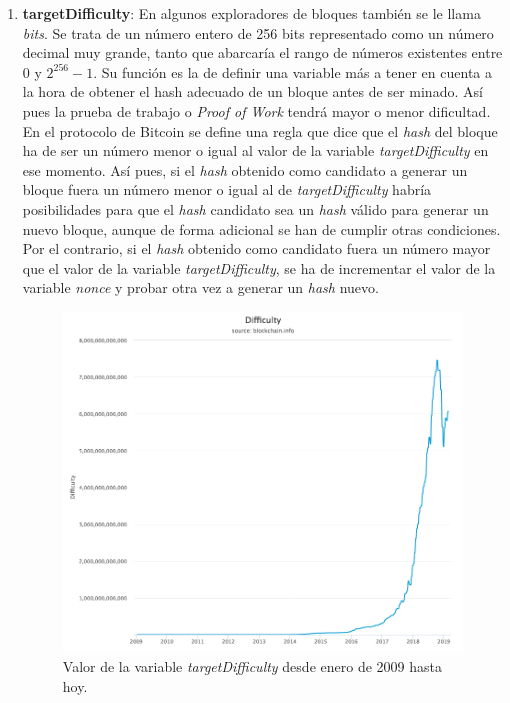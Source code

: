 \documentclass{article}
\begin{document}
\begin{enumerate}
\begin{verbatim}
    printf("Timestamp epoch: %ld\n", (long) tod);
}
        \end{verbatim}
        
    
        \item \textbf{targetDifficulty}: En algunos exploradores de bloques también se le llama \textit{bits}. Se trata de un número entero de 256 bits representado como un número decimal muy grande, tanto que abarcaría el rango de números existentes entre $0$ y $2^{256}-1$. Su función es la de definir una variable más a tener en cuenta a la hora de obtener el hash adecuado de un bloque antes de ser minado. Así pues la prueba de trabajo o \textit{Proof of Work} tendrá mayor o menor dificultad. En el protocolo de Bitcoin se define una regla que dice que el \textit{hash} del bloque ha de ser un número menor o igual al valor de la variable \textit{targetDifficulty} en ese momento. Así pues, si el \textit{hash} obtenido como candidato a generar un bloque fuera un número menor o igual al de \textit{targetDifficulty} habría posibilidades para que el \textit{hash} candidato sea un \textit{hash} válido para generar un nuevo bloque, aunque de forma adicional se han de cumplir otras condiciones. Por el contrario, si el \textit{hash} obtenido como candidato fuera un número mayor que el valor de la variable \textit{targetDifficulty}, se ha de incrementar el valor de la variable \textit{nonce} y probar otra vez a generar un \textit{hash} nuevo.
        
        \begin{figure}[H]
        \centering
            \includegraphics[scale=0.39]{img/Bitcoin_TargetDifficulty.png}
            \caption{Valor de la variable \textit{targetDifficulty} desde enero de 2009 hasta hoy.}
        \end{figure}
        

\end{enumerate}
\end{document}
